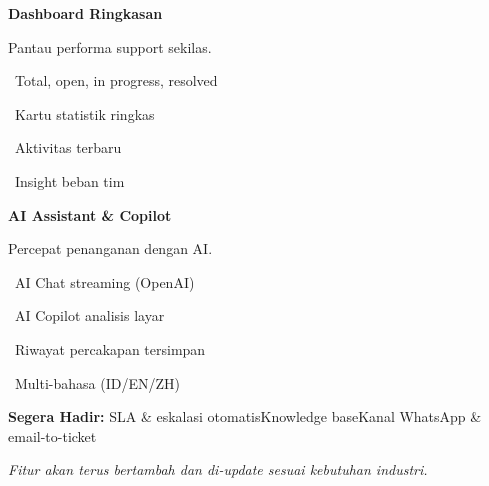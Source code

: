 \documentclass[a4paper]{article}
\begin{document}
\noindent
\begin{minipage}[t]{0.485\textwidth}
    \colorbox{OrangePrimary}{%
        \begin{minipage}{\dimexpr\textwidth-2\fboxsep\relax}
            {\fontsize{10}{13}\selectfont\bfseries\color{White} Dashboard Ringkasan}
        \end{minipage}}\par
    \vspace{4pt}
    {\fontsize{9}{12}\selectfont\color{TextDark}%
    Pantau performa support sekilas.\par\vspace{3pt}
    \textbullet\ Total, open, in progress, resolved\par\vspace{2pt}%
    \textbullet\ Kartu statistik ringkas\par\vspace{2pt}%
    \textbullet\ Aktivitas terbaru\par\vspace{2pt}%
    \textbullet\ Insight beban tim}%

\end{minipage}%
\hfill
\begin{minipage}[t]{0.485\textwidth}
    \colorbox{EmeraldDark}{%
        \begin{minipage}{\dimexpr\textwidth-2\fboxsep\relax}
            {\fontsize{10}{13}\selectfont\bfseries\color{White} AI Assistant \& Copilot}
        \end{minipage}}\par
    \vspace{4pt}
    {\fontsize{9}{12}\selectfont\color{TextDark}%
    Percepat penanganan dengan AI.\par\vspace{3pt}
    \textbullet\ AI Chat streaming (OpenAI)\par\vspace{2pt}%
    \textbullet\ AI Copilot analisis layar\par\vspace{2pt}%
    \textbullet\ Riwayat percakapan tersimpan\par\vspace{2pt}%
    \textbullet\ Multi-bahasa (ID/EN/ZH)}%

\end{minipage}

\vspace{8pt}

{\setlength{\fboxsep}{8pt}\setlength{\fboxrule}{0pt}%
\noindent\colorbox{BlueBg}{%
    \begin{minipage}{\dimexpr\textwidth-2\fboxsep\relax}
        {\fontsize{9}{12}\selectfont\bfseries\color{BlueDark} Segera Hadir:}\enspace
        {\fontsize{9}{12}\selectfont\color{TextDark} SLA \& eskalasi otomatis\enspace\textcolor{BluePrimary}{\textbullet}\enspace Knowledge base\enspace\textcolor{BluePrimary}{\textbullet}\enspace Kanal WhatsApp \& email-to-ticket}\par\vspace{3pt}
        {\fontsize{8.5}{11}\selectfont\color{TextLight}\textit{Fitur akan terus bertambah dan di-update sesuai kebutuhan industri.}}
    \end{minipage}}}
\end{document}
